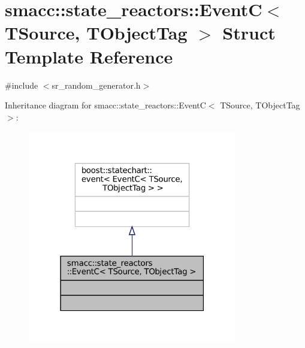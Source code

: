 \hypertarget{structsmacc_1_1state__reactors_1_1EventC}{}\section{smacc\+:\+:state\+\_\+reactors\+:\+:EventC$<$ T\+Source, T\+Object\+Tag $>$ Struct Template Reference}
\label{structsmacc_1_1state__reactors_1_1EventC}


{\ttfamily \#include $<$sr\+\_\+random\+\_\+generator.\+h$>$}



Inheritance diagram for smacc\+:\+:state\+\_\+reactors\+:\+:EventC$<$ T\+Source, T\+Object\+Tag $>$\+:
\nopagebreak
\begin{figure}[H]
\begin{center}
\leavevmode
\includegraphics[width=259pt]{structsmacc_1_1state__reactors_1_1EventC__inherit__graph}
\end{center}
\end{figure}


